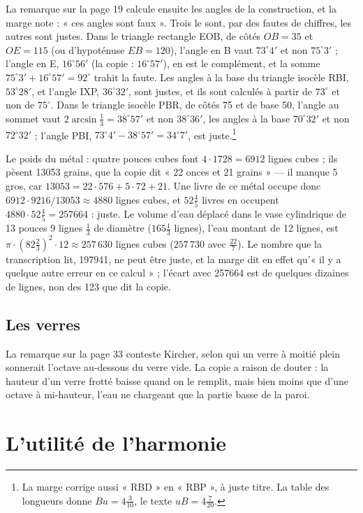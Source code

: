 \documentclass[11pt,a4paper]{article}
\begin{document}
La remarque sur la page 19 calcule ensuite les angles de la construction, et la
marge note : « ces angles sont faux ». Trois le sont, par des fautes de chiffres,
les autres sont justes. Dans le triangle rectangle EOB, de côtés $OB = 35$ et
$OE = 115$ (ou d'hypoténuse $EB = 120$), l'angle en B vaut $73^\circ 4'$ et non
$75^\circ 3'$ ; l'angle en E, $16^\circ 56'$ (la copie : $16^\circ 57'$), en est
le complément, et la somme $75^\circ 3' + 16^\circ 57' = 92^\circ$ trahit la
faute. Les angles à la base du triangle isocèle RBI, $53^\circ 28'$, et l'angle
IXP, $36^\circ 32'$, sont justes, et ils sont calculés à partir de $73^\circ$ et
non de $75^\circ$. Dans le triangle isocèle PBR, de côtés 75 et de base 50,
l'angle au sommet vaut $2\arcsin\frac13 = 38^\circ 57'$ et non $38^\circ 36'$, les
angles à la base $70^\circ 32'$ et non $72^\circ 32'$ ; l'angle PBI,
$73^\circ 4' - 38^\circ 57' = 34^\circ 7'$, est juste.\footnote{La marge corrige
aussi « RBD » en « RBP », à juste titre. La table des longueurs donne $Bu =
4\frac{3}{10}$, le texte $uB = 4\frac{7}{20}$.}

Le poids du métal : quatre pouces cubes font $4 \cdot 1728 = 6912$ lignes
cubes ; ils pèsent 13053 grains, que la copie dit « 22 onces et 21 grains » — il
manque 5 gros, car $13053 = 22 \cdot 576 + 5 \cdot 72 + 21$. Une livre de ce
métal occupe donc $6912 \cdot 9216 / 13053 \approx 4880$ lignes cubes, et
$52\frac45$ livres en occupent $4880 \cdot 52\frac45 = 257664$ : juste. Le
volume d'eau déplacé dans le vase cylindrique de 13 pouces 9 lignes $\frac13$ de
diamètre ($165\frac13$ lignes), l'eau montant de 12 lignes, est
$\pi \cdot (82\frac23)^2 \cdot 12 \approx 257\,630$ lignes cubes ($257\,730$
avec $\frac{22}{7}$). Le nombre que la transcription lit, 197941, ne peut être
juste, et la marge dit en effet qu'« il y a quelque autre erreur en ce
calcul » ; l'écart avec 257664 est de quelques dizaines de lignes, non des 123
que dit la copie.

\subsection*{Les verres}

La remarque sur la page 33 conteste Kircher, selon qui un verre à moitié plein
sonnerait l'octave au-dessous du verre vide. La copie a raison de douter : la
hauteur d'un verre frotté baisse quand on le remplit, mais bien moins que d'une
octave à mi-hauteur, l'eau ne chargeant que la partie basse de la paroi.

\section*{L'utilité de l'harmonie}
\end{document}

